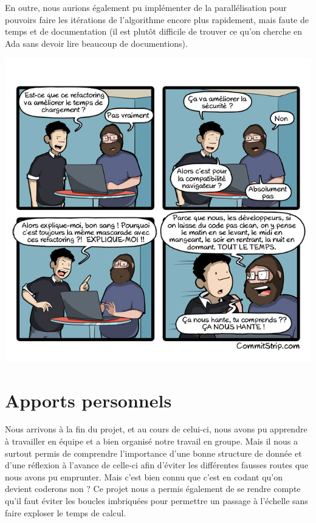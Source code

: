 \documentclass{NewTeX}
\begin{document}
En outre, nous aurions également pu implémenter de la parallélisation pour pouvoirs faire les itérations de l'algorithme encore plus rapidement, mais faute de temps et de documentation (il est plutôt difficile de trouver ce qu'on cherche en Ada sans devoir lire beaucoup de documentions).

\begin{center}
    \href{https://www.commitstrip.com}{\includegraphics[width=\textwidth]{Strip-Refractoring-du-code-650-final.jpg}}
\end{center}

\section{Apports personnels}

Nous arrivons à la fin du projet, et au cours de celui-ci, nous avons pu apprendre à travailler en équipe et a bien organisé notre travail en groupe. Mais il nous a surtout permis de comprendre l'importance d'une bonne structure de donnée et d'une réflexion à l'avance de celle-ci afin d'éviter les différentes fausses routes que nous avons pu emprunter. Mais c'est bien connu que c'est en codant qu'on devient coderons non ? Ce projet nous a permis également de se rendre compte qu'il faut éviter les boucles imbriquées pour permettre un passage à l'échelle sans faire exploser le temps de calcul.
\end{document}
